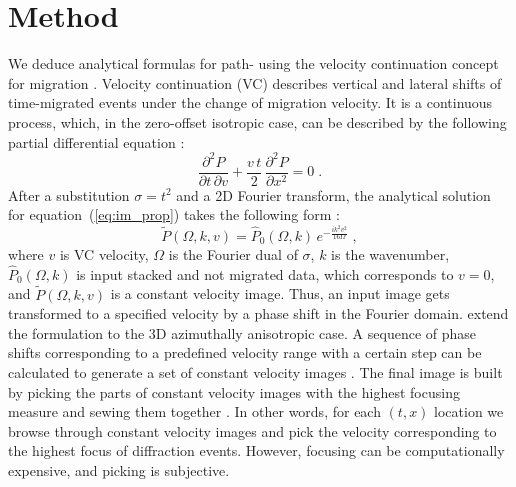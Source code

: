 \section{Method}
We deduce analytical formulas for path-  using the velocity continuation
concept for migration \cite[]{Fomel_03_VC_}.
Velocity continuation (VC) describes vertical and lateral shifts of time-migrated events under the change of migration velocity.
It is a continuous process, which, in the zero-offset isotropic case, can be described by the following partial differential equation 
\cite[]{claerbout86,fomel94,Fomel_03_VC_}: 
\begin{equation}
\label{eq:im_prop}
\frac{\partial^2 P}{\partial t\,\partial v} + \frac{v\,t}{2}\,\frac{\partial^2 P}{\partial x^2}=0\;.
\end{equation}
After a substitution $\sigma=t^2$ and a 2D Fourier transform, the analytical solution for equation~(\ref{eq:im_prop})
takes the following form \cite[]{Fomel_03_VC}:
\begin{equation}
\label{eq:vc}
\tilde{P}(\Omega,k,v) = \hat{P}_0 (\Omega,k)\,e^{-\frac{i k^2 v^2 }{16\Omega}}\;,
\end{equation}
where $v$ is VC velocity, $\Omega$ is the Fourier dual of $\sigma$, $k$ is the wavenumber, $\hat{P}_0 (\Omega,k)$ 
is input stacked and not migrated data, which corresponds to $v=0$, and
$\tilde{P}(\Omega,k,v)$ is a constant velocity image.  
Thus, an input image gets transformed to a specified velocity by a  phase shift in the Fourier domain.
\cite{Burnett_aniso}
extend the formulation to the 3D azimuthally anisotropic case.
A sequence of phase shifts corresponding
to a predefined velocity range with a certain step can be calculated to generate a set of constant velocity images
\cite[]{larner, mikulich,yilmaz2001unified}. 
The final image is built by picking the parts of constant velocity images with the highest focusing measure and sewing them together
\cite[]{fomel07}.
In other words, for each $(t,x)$ location we browse through constant velocity images and pick the velocity corresponding 
to the highest focus of diffraction events. However,  focusing 
can be computationally expensive, and picking is subjective.  
 
